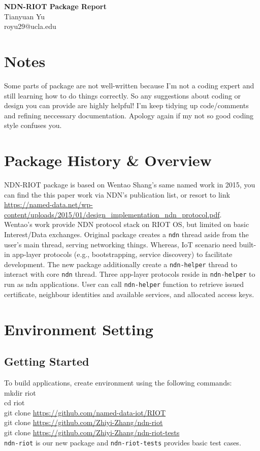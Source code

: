 \documentclass[a4paper, 11pt]{article}
\begin{document}
        \noindent
        \large\textbf{NDN-RIOT Package Report} \\ 
        \normalsize Tianyuan Yu \\ royu29@ucla.edu
        
        \section*{Notes}
        Some parts of package are not well-written because I'm not a coding expert and still learning how to do things correctly. So any suggestions about coding or design you can provide are highly helpful! I'm keep tidying up code/comments and refining neccessary documentation. Apology again if my not so good coding style confuses you.

        \section*{Package History \& Overview}
        NDN-RIOT package is based on Wentao Shang's same named work in 2015, you can find the this paper work via NDN's publication list, or resort to link \url{https://named-data.net/wp-content/uploads/2015/01/design_implementation_ndn_protocol.pdf}.\\ Wentao's work provide NDN protocol stack on RIOT OS, but limited on basic Interest/Data exchanges. Original package creates a \texttt{ndn} thread aside from the user's main thread, serving networking things. Whereas, IoT scenario need built-in app-layer protocols (e.g., bootstrapping, service discovery) to facilitate development. The new package additionally create a \texttt{ndn-helper} thread to interact with core \texttt{ndn} thread. Three app-layer protocols reside in \texttt{ndn-helper} to run as ndn applications. User can call \texttt{ndn-helper} function to retrieve issued certificate, neighbour identities and available services, and allocated access keys.
        
        \section*{Environment Setting}
        \subsection*{Getting Started}
        To build applications, create environment using the following commands: \\
            mkdir riot \\
            cd riot \\
            git clone \url{https://github.com/named-data-iot/RIOT} \\
            git clone \url{https://github.com/Zhiyi-Zhang/ndn-riot} \\
            git clone \url{https://github.com/Zhiyi-Zhang/ndn-riot-tests} \\
        \texttt{ndn-riot} is our new package and \texttt{ndn-riot-tests} provides basic test cases.        
\end{document}
